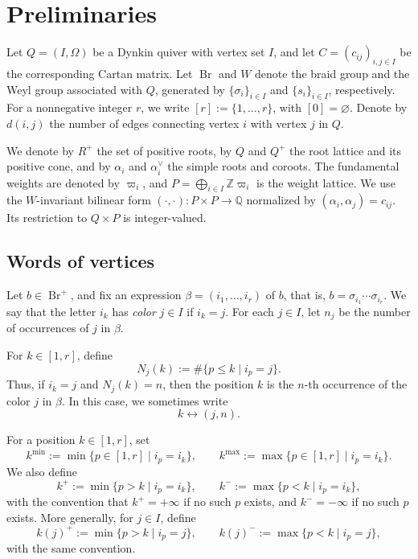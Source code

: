 \documentclass[12pt, reqno]{amsart}
\theoremstyle{plain}
\theoremstyle{definition}
\numberwithin{equation}{section}
\newcommand{\Br}{{\operatorname{Br}}}
\begin{document}
\section{Preliminaries}\label{sec:pre}

Let \(Q=(I,\Omega)\) be a Dynkin quiver with vertex set \(I\), and let
\(C=(c_{ij})_{i,j\in I}\) be the corresponding Cartan matrix.
Let $\Br$ and $W$ denote the braid group and the Weyl group associated with $Q$,
generated by $\{\sigma_i\}_{i\in I}$ and $\{s_i\}_{i\in I}$, respectively.
For a nonnegative integer $r$, we write $[r]:=\{1,\dots,r\}$, with $[0]=\varnothing$. Denote by $d(i,j)$ the number of edges connecting vertex $i$ with vertex $j$ in $Q$. 

We denote by $R^+$ the set of positive roots, by $Q$ and $Q^+$ the root
lattice and its positive cone, and by $\alpha_i$ and $\alpha_i^\vee$ the
simple roots and coroots. The fundamental weights are denoted by
$\varpi_i$, and $P=\bigoplus_{i\in I}\mathbb Z\varpi_i$ is the weight
lattice. We use the $W$-invariant bilinear form
$(\cdot,\cdot):P\times P\to\mathbb Q$ normalized by
$(\alpha_i,\alpha_j)=c_{ij}$. Its restriction to $Q\times P$ is
integer-valued.

\subsection{Words of vertices}\label{subsec:words}

Let \(b\in \Br^+\), and fix an expression
\(
\beta=(i_1,\dots,i_r)
\)
of \(b\), that is,
\(
b=\sigma_{i_1}\cdots \sigma_{i_r}.
\)
We say that the letter \(i_k\) has \emph{color} \(j\in I\) if \(i_k=j\).
For each \(j\in I\), let \(n_j\) be the number of occurrences of \(j\) in \(\beta\).

For \(k\in[1,r]\), define
\[
N_j(k):=\#\{p\le k\mid i_p=j\}.
\]
Thus, if \(i_k=j\) and \(N_j(k)=n\), then the position \(k\) is the
\(n\)-th occurrence of the color \(j\) in \(\beta\). In this case, we sometimes
write
\[
k\leftrightarrow (j,n).
\]

For a position \(k\in[1,r]\), set
\[
k^{\min}:=\min\{p\in[1,r]\mid i_p=i_k\},
\qquad
k^{\max}:=\max\{p\in[1,r]\mid i_p=i_k\}.
\]
We also define
\[
k^+:=\min\{p>k\mid i_p=i_k\},
\qquad
k^-:=\max\{p<k\mid i_p=i_k\},
\]
with the convention that \(k^+=+\infty\) if no such \(p\) exists, and
\(k^-=-\infty\) if no such \(p\) exists. More generally, for \(j\in I\), define
\[
k(j)^+ := \min\{p>k\mid i_p=j\},
\qquad
k(j)^- := \max\{p<k\mid i_p=j\},
\]
with the same convention.
\end{document}
